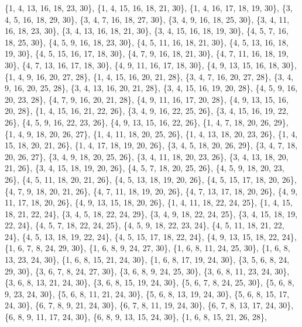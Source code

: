 \documentclass[11pt,a4paper]{article}
\begin{document}
{\{1, 4, 13, 16, 18, 23, 30\}, \{1, 4, 15, 16, 18, 21, 30\}, \{1, 4, 16, 17, 18, 19, 30\}, \{3, 4, 5, 16, 18, 29, 30\}, \{3, 4, 7, 16, 18, 27, 30\},
\{3, 4, 9, 16, 18, 25, 30\}, \{3, 4, 11, 16, 18, 23, 30\}, \{3, 4, 13, 16, 18, 21, 30\}, \{3, 4, 15, 16, 18, 19, 30\}, \{4, 5, 7, 16, 18, 25, 30\},
\{4, 5, 9, 16, 18, 23, 30\}, \{4, 5, 11, 16, 18, 21, 30\}, \{4, 5, 13, 16, 18, 19, 30\}, \{4, 5, 15, 16, 17, 18, 30\}, \{4, 7, 9, 16, 18, 21, 30\},
\{4, 7, 11, 16, 18, 19, 30\}, \{4, 7, 13, 16, 17, 18, 30\}, \{4, 9, 11, 16, 17, 18, 30\}, \{4, 9, 13, 15, 16, 18, 30\}, \{1, 4, 9, 16, 20, 27, 28\},
\{1, 4, 15, 16, 20, 21, 28\}, \{3, 4, 7, 16, 20, 27, 28\}, \{3, 4, 9, 16, 20, 25, 28\}, \{3, 4, 13, 16, 20, 21, 28\}, \{3, 4, 15, 16, 19, 20, 28\},
\{4, 5, 9, 16, 20, 23, 28\}, \{4, 7, 9, 16, 20, 21, 28\}, \{4, 9, 11, 16, 17, 20, 28\}, \{4, 9, 13, 15, 16, 20, 28\}, \{1, 4, 15, 16, 21, 22, 26\},
\{3, 4, 9, 16, 22, 25, 26\}, \{3, 4, 15, 16, 19, 22, 26\}, \{4, 5, 9, 16, 22, 23, 26\}, \{4, 9, 13, 15, 16, 22, 26\}, \{1, 4, 7, 18, 20, 26, 29\},
\{1, 4, 9, 18, 20, 26, 27\}, \{1, 4, 11, 18, 20, 25, 26\}, \{1, 4, 13, 18, 20, 23, 26\}, \{1, 4, 15, 18, 20, 21, 26\}, \{1, 4, 17, 18, 19, 20, 26\},
\{3, 4, 5, 18, 20, 26, 29\}, \{3, 4, 7, 18, 20, 26, 27\}, \{3, 4, 9, 18, 20, 25, 26\}, \{3, 4, 11, 18, 20, 23, 26\}, \{3, 4, 13, 18, 20, 21, 26\},
\{3, 4, 15, 18, 19, 20, 26\}, \{4, 5, 7, 18, 20, 25, 26\}, \{4, 5, 9, 18, 20, 23, 26\}, \{4, 5, 11, 18, 20, 21, 26\}, \{4, 5, 13, 18, 19, 20, 26\},
\{4, 5, 15, 17, 18, 20, 26\}, \{4, 7, 9, 18, 20, 21, 26\}, \{4, 7, 11, 18, 19, 20, 26\}, \{4, 7, 13, 17, 18, 20, 26\}, \{4, 9, 11, 17, 18, 20, 26\},
\{4, 9, 13, 15, 18, 20, 26\}, \{1, 4, 11, 18, 22, 24, 25\}, \{1, 4, 15, 18, 21, 22, 24\}, \{3, 4, 5, 18, 22, 24, 29\}, \{3, 4, 9, 18, 22, 24, 25\},
\{3, 4, 15, 18, 19, 22, 24\}, \{4, 5, 7, 18, 22, 24, 25\}, \{4, 5, 9, 18, 22, 23, 24\}, \{4, 5, 11, 18, 21, 22, 24\}, \{4, 5, 13, 18, 19, 22, 24\},
\{4, 5, 15, 17, 18, 22, 24\}, \{4, 9, 13, 15, 18, 22, 24\}, \{1, 6, 7, 8, 24, 29, 30\}, \{1, 6, 8, 9, 24, 27, 30\}, \{1, 6, 8, 11, 24, 25, 30\},
\{1, 6, 8, 13, 23, 24, 30\}, \{1, 6, 8, 15, 21, 24, 30\}, \{1, 6, 8, 17, 19, 24, 30\}, \{3, 5, 6, 8, 24, 29, 30\}, \{3, 6, 7, 8, 24, 27, 30\},
\{3, 6, 8, 9, 24, 25, 30\}, \{3, 6, 8, 11, 23, 24, 30\}, \{3, 6, 8, 13, 21, 24, 30\}, \{3, 6, 8, 15, 19, 24, 30\}, \{5, 6, 7, 8, 24, 25, 30\},
\{5, 6, 8, 9, 23, 24, 30\}, \{5, 6, 8, 11, 21, 24, 30\}, \{5, 6, 8, 13, 19, 24, 30\}, \{5, 6, 8, 15, 17, 24, 30\}, \{6, 7, 8, 9, 21, 24, 30\},
\{6, 7, 8, 11, 19, 24, 30\}, \{6, 7, 8, 13, 17, 24, 30\}, \{6, 8, 9, 11, 17, 24, 30\}, \{6, 8, 9, 13, 15, 24, 30\}, \{1, 6, 8, 15, 21, 26, 28\},
}
\end{document}
